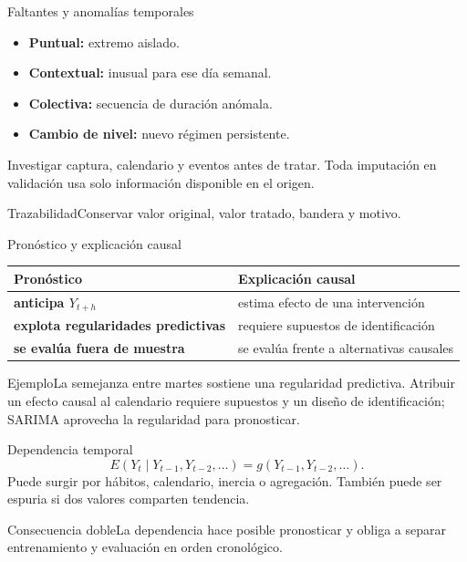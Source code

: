 \documentclass[aspectratio=169,10pt]{beamer}
\newcommand{\concepto}[1]{\textcolor{UAPTeal}{\textbf{#1}}}
\begin{document}
\begin{frame}{Faltantes y anomalías temporales}\small
\begin{itemize}\item \concepto{Puntual:} extremo aislado.\item \concepto{Contextual:} inusual para ese día semanal.\item \concepto{Colectiva:} secuencia de duración anómala.\item \concepto{Cambio de nivel:} nuevo régimen persistente.\end{itemize}
Investigar captura, calendario y eventos antes de tratar. Toda imputación en validación usa solo información disponible en el origen.
\begin{block}{Trazabilidad}Conservar valor original, valor tratado, bandera y motivo.\end{block}
\end{frame}

\begin{frame}{Pronóstico y explicación causal}\small
\begin{tabularx}{\textwidth}{>{\bfseries}XX}\toprule Pronóstico & Explicación causal\\\midrule anticipa $Y_{t+h}$ & estima efecto de una intervención\\ explota regularidades predictivas & requiere supuestos de identificación\\ se evalúa fuera de muestra & se evalúa frente a alternativas causales\\\bottomrule\end{tabularx}
\begin{block}{Ejemplo}La semejanza entre martes sostiene una regularidad predictiva. Atribuir un efecto causal al calendario requiere supuestos y un diseño de identificación; SARIMA aprovecha la regularidad para pronosticar.\end{block}
\end{frame}

\begin{frame}{Dependencia temporal}\small
\[E(Y_t\mid Y_{t-1},Y_{t-2},\ldots)=g(Y_{t-1},Y_{t-2},\ldots).\]
Puede surgir por hábitos, calendario, inercia o agregación. También puede ser espuria si dos valores comparten tendencia.
\begin{block}{Consecuencia doble}La dependencia hace posible pronosticar y obliga a separar entrenamiento y evaluación en orden cronológico.\end{block}
\end{frame}
\end{document}
